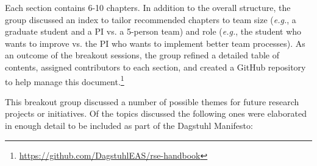 \documentclass[a4paper,UKenglish]{dagrep}
\newcommand{\eg}{\emph{e.g.},\xspace}
\begin{document}
Each section contains 6-10 chapters. In addition to the overall structure, the group discussed an index to tailor recommended chapters to team size (\eg a graduate student and a PI vs. a 5-person team) and role (\eg the student who wants to improve vs. the PI who wants to implement better team processes). As an outcome of the breakout sessions, the group refined a detailed table of contents, assigned contributors to each section, and created a GitHub repository to help manage this document.\footnote{\url{https://github.com/DagstuhlEAS/rse-handbook}}


This breakout group discussed a number of possible themes for future research projects or initiatives.
Of the topics discussed the following ones were elaborated in enough detail to be included as part of the Dagstuhl Manifesto:
\end{document}
